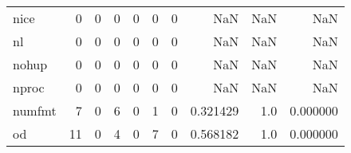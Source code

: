 \begin{longtable}{lrrrrrrrrr}
nice      &                                                  0 &                                                  0 &                                                  0 &                                                  0 &                                                  0 &                                                  0 &                                                NaN &                                    NaN &                                  NaN \\
nl        &                                                  0 &                                                  0 &                                                  0 &                                                  0 &                                                  0 &                                                  0 &                                                NaN &                                    NaN &                                  NaN \\
nohup     &                                                  0 &                                                  0 &                                                  0 &                                                  0 &                                                  0 &                                                  0 &                                                NaN &                                    NaN &                                  NaN \\
nproc     &                                                  0 &                                                  0 &                                                  0 &                                                  0 &                                                  0 &                                                  0 &                                                NaN &                                    NaN &                                  NaN \\
numfmt    &                                                  7 &                                                  0 &                                                  6 &                                                  0 &                                                  1 &                                                  0 &                                           0.321429 &                                    1.0 &                             0.000000 \\
od        &                                                 11 &                                                  0 &                                                  4 &                                                  0 &                                                  7 &                                                  0 &                                           0.568182 &                                    1.0 &                             0.000000 \\

\end{longtable}
